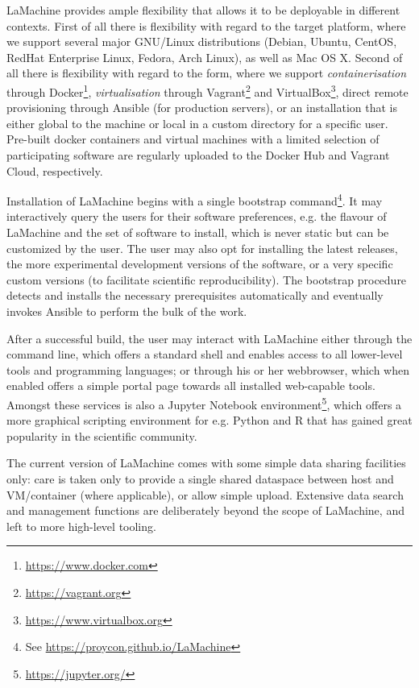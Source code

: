 \documentclass[a4paper,11pt]{article}
\begin{document}
LaMachine provides ample flexibility that allows it to be deployable in different contexts. First of all there is
flexibility with regard to the target platform, where we support several major GNU/Linux distributions (Debian, Ubuntu,
CentOS, RedHat Enterprise Linux, Fedora, Arch Linux), as well as Mac OS X. Second of all there is flexibility with
regard to the form, where we support \emph{containerisation} through Docker\footnote{\url{https://www.docker.com}},
\emph{virtualisation} through Vagrant\footnote{\url{https://vagrant.org}} and VirtualBox\footnote{\url{https://www.virtualbox.org}},
direct remote provisioning through Ansible (for production servers), or an installation that is either global to the
machine or local in a custom directory for a specific user. Pre-built docker containers and virtual machines with a
limited selection of participating software are regularly uploaded to the Docker Hub and Vagrant Cloud, respectively.

Installation of LaMachine begins with a single bootstrap command\footnote{See
\url{https://proycon.github.io/LaMachine}}.  It may interactively query the users for their software preferences, e.g.
the flavour of LaMachine and the set of software to install, which is never static but can be customized by the user.
The user may also opt for installing the latest releases, the more experimental development versions of the software, or
a very specific custom versions (to facilitate scientific reproducibility). The bootstrap procedure detects and installs
the necessary prerequisites automatically and eventually invokes Ansible to perform the bulk of the work.

After a successful build, the user may interact with LaMachine either through the command line, which offers a standard
shell and enables access to all lower-level tools and programming languages; or through his or her webbrowser, which
when enabled offers a simple portal page towards all installed web-capable tools. Amongst these services is also a
Jupyter Notebook environment\footnote{\url{https://jupyter.org/}}, which offers a more graphical scripting environment
for e.g. Python and R that has gained great popularity in the scientific community.

The current version of LaMachine comes with some simple data sharing facilities only: care is taken only to provide a
single shared dataspace between host and VM/container (where applicable), or allow simple upload. Extensive data
search and management functions are deliberately beyond the scope of LaMachine, and left to more high-level tooling.
\end{document}
